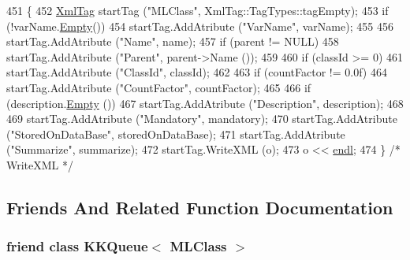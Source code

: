 \begin{DoxyCode}
451 \{
452   \hyperlink{class_k_k_b_1_1_xml_tag}{XmlTag} startTag (\textcolor{stringliteral}{"MLClass"}, XmlTag::TagTypes::tagEmpty);
453   \textcolor{keywordflow}{if}  (!varName.\hyperlink{class_k_k_b_1_1_k_k_str_ac69942f73fffd672ec2a6e1c410afdb6}{Empty}())
454     startTag.AddAtribute (\textcolor{stringliteral}{"VarName"}, varName);
455   
456   startTag.AddAtribute (\textcolor{stringliteral}{"Name"},  name);
457   \textcolor{keywordflow}{if}  (parent != NULL)
458     startTag.AddAtribute (\textcolor{stringliteral}{"Parent"}, parent->Name ());
459 
460   \textcolor{keywordflow}{if}  (classId >= 0)
461     startTag.AddAtribute (\textcolor{stringliteral}{"ClassId"}, classId);
462 
463   \textcolor{keywordflow}{if}  (countFactor != 0.0f)
464     startTag.AddAtribute (\textcolor{stringliteral}{"CountFactor"}, countFactor);
465 
466   \textcolor{keywordflow}{if}  (description.\hyperlink{class_k_k_b_1_1_k_k_str_ac69942f73fffd672ec2a6e1c410afdb6}{Empty} ())
467     startTag.AddAtribute (\textcolor{stringliteral}{"Description"}, description);
468 
469   startTag.AddAtribute (\textcolor{stringliteral}{"Mandatory"},        mandatory);
470   startTag.AddAtribute (\textcolor{stringliteral}{"StoredOnDataBase"}, storedOnDataBase);
471   startTag.AddAtribute (\textcolor{stringliteral}{"Summarize"},        summarize);
472   startTag.WriteXML (o);
473   o << \hyperlink{namespace_k_k_b_ad1f50f65af6adc8fa9e6f62d007818a8}{endl};
474 \}  \textcolor{comment}{/* WriteXML */}
\end{DoxyCode}


\subsection{Friends And Related Function Documentation}
\subsubsection[{\texorpdfstring{K\+K\+Queue$<$ M\+L\+Class $>$}{KKQueue< MLClass >}}]{\setlength{\rightskip}{0pt plus 5cm}friend class {\bf K\+K\+Queue}$<$ {\bf M\+L\+Class} $>$\hspace{0.3cm}{\ttfamily [friend]}}\hypertarget{class_k_k_m_l_l_1_1_m_l_class_a51bf46485affc430ffb996a9e88c0ad5}{}\label{class_k_k_m_l_l_1_1_m_l_class_a51bf46485affc430ffb996a9e88c0ad5}


